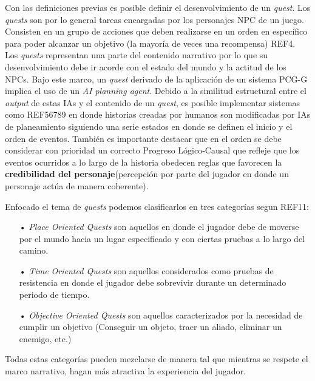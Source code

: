 Con las definiciones previas es posible definir el desenvolvimiento de un \textit{quest}. Los \textit{quests} son por lo general tareas encargadas por los personajes \ac{NPC} de un juego. Consisten en un grupo de acciones que deben realizarse en un orden en específico para poder alcanzar un objetivo (la mayoría de veces una recompensa) REF4. Los \textit{quests} representan una parte del contenido narrativo por lo que su desenvolvimiento debe ir acorde con el estado del mundo y la actitud de los \ac{NPCs}. Bajo este marco, un \textit{quest} derivado de la aplicación de un sistema \ac{PCG-G} implica el uso de un \textit{AI planning agent}. Debido a la similitud estructural entre el \textit{output} de estas IAs y el contenido de un \textit{quest}, es posible implementar sistemas como REF56789 en donde historias creadas por humanos son modificadas por IAs de planeamiento siguiendo una serie estados en donde se definen el inicio y el orden de eventos. También es importante destacar que en el orden se debe considerar con prioridad un correcto Progreso Lógico-Causal que refleje que los eventos ocurridos a lo largo de la historia obedecen reglas que favorecen la \textbf{credibilidad del personaje}(percepción por parte del jugador en  donde un personaje actúa de manera coherente).

Enfocado el tema de \textit{quests} podemos clasificarlos en tres categorías segun REF11:

\begin{itemize}
\item[•] \textit{Place Oriented Quests} son aquellos en donde el jugador debe de moverse por el mundo hacia un lugar especificado y con ciertas pruebas a lo largo del camino.
\item[•] \textit{Time Oriented Quests} son aquellos considerados como pruebas de resistencia en donde el jugador debe sobrevivir durante un determinado periodo de tiempo.
\item[•] \textit{Objective Oriented Quests} son aquellos caracterizados por la necesidad de cumplir un objetivo (Conseguir un objeto, traer un aliado, eliminar un enemigo, etc.)
\end{itemize}

Todas estas categorías pueden mezclarse de manera tal que mientras se respete el marco narrativo, hagan más atractiva la experiencia del jugador.




